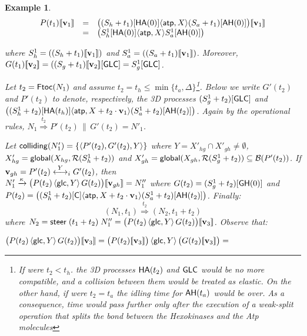\documentclass[11pt]{article}
\newtheorem{example}{Example}
\newcommand{\lsbrace}{\ensuremath{|\![}}
\newcommand{\rsbrace}{\ensuremath{]\!|}}
\newcommand{\reference}{{\sf global}}
\newcommand{\colliding}{{\sf colliding}}
\newcommand{\ftoc}{{\sf Ftoc}}
\newcommand{\mts}{\Delta}
\newcommand{\move}{\ensuremath{\mathsf{steer}}}
\newcommand{\nar}[1]{\xrightarrow{#1}}
\newcommand{\dnar}[1]{\stackrel{#1}{\Rightarrow}}
\newcommand{\collision}[2]{\stackrel{{#1}}{\longleftrightarrow}_{#2}}
\newcommand{\boundary}[1]{\ensuremath{{\cal B}(#1)}}
\newcommand{\referencepoint}[1]{\ensuremath{{\cal R}(#1)}}
\begin{document}
\begin{example}
$$
\begin{array}{lcl}
P(t_1) \lsbrace {\bf v}_{1} \rsbrace  & =  & \big((S_h+t_1) [{\sf HA}(0)] \langle {\sf atp}, X
\rangle (S_a+t_1)[{\sf AH}(0)] \big)\lsbrace {\bf v}_{1} \rsbrace  \\
& = & \big( S_h^1 [{\sf HA}(0)] \langle {\sf atp}, X \rangle S_a^1 [{\sf AH}(0)] \big)  \\
\end{array}
$$

\noindent where $S_h^1 = ((S_h+t_1)\lsbrace {\bf v}_{1} \rsbrace)$ and $S_a^1 = ((S_a+t_1)\lsbrace
{\bf v}_{1} \rsbrace)$. Moreover, $G(t_1) \lsbrace {\bf v}_{2} \rsbrace  =  ((S_g + t_1)\lsbrace
{\bf v}_{2} \rsbrace [{\sf GLC}]= S_g^1 [{\sf GLC}]$.

Let $t_2 = \ftoc(N_1)$ and assume $t_2 = t_h \leq \min \{t_a, \mts\}$\footnote{If were $t_2 < t_h$. the 3D processes ${\sf HA}(t_2)$ and ${\sf GLC}$ would be no more compatible, and a collision between them would be treated as elastic. On the other hand, if were $t_2 = t_a$ the idling time for ${\sf AH}(t_a)$ would be over. As a consequence, time would pass further only after the execution of a weak-split operation that splits the bond between the Hexokinases and the Atp molecules}. Below we write $G'(t_2)$ and $P'(t_2)$ to denote, respectively, the 3D processes $(S_g^1 + t_2)[{\sf GLC}]$ and $\big( (S_h^1 + t_2) [{\sf HA}(t_h)] \langle {\sf atp}, X + t_2 \cdot {\bf v}_1 \rangle (S_a^1 + t_2) [{\sf AH}(t_2)] \big)$. Again by the operational rules, $N_1 \dnar{t_2}  P'(t_2) \,\|\, G'(t_2) = N'_1$.

Let $\colliding(N'_1) = \{\langle P'(t_2), G'(t_2), Y \rangle \}$ where $Y =
X'_{hg} \cap X'_{gh} \neq \emptyset$, $X'_{hg} = \reference(X_{hg},
\referencepoint{S^1_h + t_2})$ and $X'_{gh} =
\reference(X_{gh},\referencepoint{S^1_g + t_2}) \subseteq \\
\boundary{P'(t_2)}$. If ${\bf v}_{gh} = P'(t_2) \collision{Y}{i} G'(t_2)$, then
\\ $N'_1 \nar{\kappa} \big( P(t_2) \, \langle {\sf glc},Y \rangle \, G(t_2)\big)
\lsbrace {\bf v}_{gh} \rsbrace = N''_1$ where $G(t_2) = (S_g^1 + t_2)[{\sf
GH}(0)]$ and $P(t_2) = \big( (S_h^1 + t_2) [{\sf C}] \langle {\sf atp}, X + t_2
\cdot {\bf v}_1 \rangle (S_a^1 + t_2) [{\sf AH}(t_2)] \big)$.  Finally: $$(N_1,
t_1) \dnar{t_2} (N_2, t_1 + t_2)$$ where $N_2 = \move \; (t_1 + t_2) \;  N''_1
= \big( P(t_2) \, \langle {\sf glc}, Y \rangle \, G(t_2)\big) \lsbrace {\bf
v}_{3} \rsbrace$. Observe that:

$\big( P(t_2) \, \langle {\sf glc}, Y \rangle \, G(t_2)\big) \lsbrace {\bf v}_{3} \rsbrace =
\big( P(t_2)  \lsbrace {\bf v}_{3} \rsbrace \big) \, \langle {\sf glc}, Y \rangle \, \big(G(t_2)
\lsbrace {\bf v}_{3} \rsbrace \big) =$


\end{example}
\end{document}
